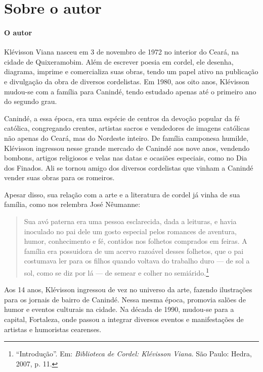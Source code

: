 \documentclass[11pt]{extarticle}
\begin{document}
\reversemarginpar
\marginparwidth=5cm


\section{Sobre o autor}


\paragraph{O autor}
Klévisson Viana nasceu em 3 de novembro de 1972 no interior do Ceará, na cidade de Quixeramobim. Além de escrever poesia em cordel, ele desenha, diagrama, imprime e comercializa suas obras, tendo um papel ativo na publicação e divulgação da obra de diversos cordelistas. Em 1980, aos oito anos, Klévisson mudou-se com a família para Canindé, tendo estudado apenas até o primeiro ano do segundo grau.

Canindé, a essa época, era uma espécie de centros da devoção popular da fé católica, congregando crentes, artistas sacros e vendedores de imagens católicas não
apenas do Ceará, mas do Nordeste inteiro. De família camponesa humilde, Klévisson ingressou nesse grande mercado de Canindé aos nove anos, vendendo bombons, artigos religiosos e velas nas datas e ocasiões especiais, como no Dia dos Finados.
Ali se tornou amigo dos diversos cordelistas que vinham a Canindé vender suas obras para os romeiros.

Apesar disso, sua relação com a arte e a literatura de cordel já vinha de sua família, como nos relembra José Nêumanne:

\begin{quote}
Sua avó paterna era uma pessoa esclarecida, dada a leituras, e havia inoculado no pai dele um gosto especial pelos romances de aventura, humor, conhecimento e fé, contidos nos folhetos comprados em feiras. A família era possuidora de um acervo razoável desses folhetos, que o pai costumava ler para os filhos quando voltava do trabalho duro --- de sol a sol, como se diz por lá --- de semear e colher no semiárido.\footnote{``Introdução''. Em: \textit{Biblioteca de Cordel: Klévisson Viana}. São Paulo: Hedra, 2007, p. 11.}
\end{quote}

Aos 14 anos, Klévisson ingressou de vez no universo da arte, fazendo ilustrações para os jornais de bairro de Canindé. Nessa mesma época, promovia salões de humor e eventos culturais na cidade. Na década de 1990, mudou-se para a capital, Fortaleza, onde passou a integrar diversos eventos e manifestações de artistas e humoristas cearenses.
\end{document}
